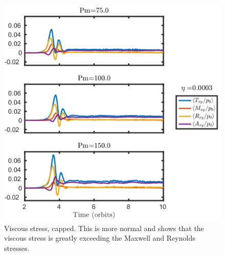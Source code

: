 \begin{figure}[h]
  \begin{center}  
    \includegraphics[width=.9\textwidth, angle=0.]{img/npLimiter-eta3-Pm11-13_StressesZoom.pdf}
  \end{center}
  \caption{Viscous stress, capped. This is more normal and shows that the viscous stress is greatly exceeding the Maxwell and Reynolds stresses.}
  \label{fig:viscnp}
\end{figure}


